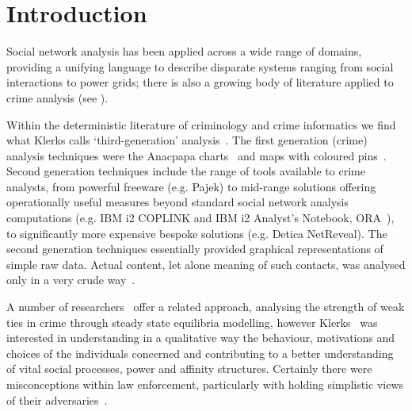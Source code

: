 \documentclass[conference]{IEEEtran}
\theoremstyle{definition}
\begin{document}
\section{Introduction}\label{sec:introduction}
Social network analysis has been applied across a wide range of
domains, providing a unifying language to describe disparate systems
ranging from social interactions to power grids; there is also a
growing body of literature applied to crime analysis (see
\cite{Klerks2001,OatleyZeleznikowLearyEwart2005,OatleyEwartZeleznikow2006,BaronTindall1993,Hansen2005,CalvoArmengolZenou2006,PatacchiniZenou2008,HutchinsBenhamHutchins2009}).

Within the deterministic literature of criminology and crime
informatics we find what Klerks calls `third-generation'
analysis~\cite{Klerks2001}. The first generation (crime) analysis
techniques were the Anacpapa charts~\cite{harper+harris:1975} and maps
with coloured pins~\cite{OatleyEwart2003}. Second generation
techniques include the range of tools available to crime analysts,
from powerful freeware (e.g. Pajek) to mid-range solutions offering
operationally useful measures beyond standard social network analysis
computations (e.g. IBM i2 COPLINK and IBM i2 Analyst's Notebook,
ORA~\cite{HutchinsBenhamHutchins2009}), to significantly more
expensive bespoke solutions (e.g. Detica NetReveal). The second
generation techniques essentially provided graphical representations
of simple raw data. Actual content, let alone meaning of such contacts,
was analysed only in a very crude way~\cite{Klerks2001}.


 
A number of researchers~\cite{CalvoArmengolVerdierZenou2007,PatacchiniZenou2008}
offer a related approach, analysing the strength of weak ties in crime
through steady state equilibria modelling, however
Klerks~\cite{Klerks2001} was interested in understanding in a
qualitative way the behaviour, motivations and choices of the
individuals concerned and contributing to a better understanding of
vital social processes, power and affinity structures. Certainly there
were misconceptions within law enforcement, particularly with holding
 simplistic views of their adversaries~\cite{Klerks2001}. 
\end{document}
